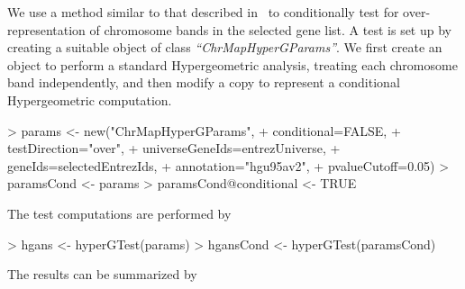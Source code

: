 \documentclass[11pt]{article}
\newcommand{\Rclass}[1]{\textit{``#1''}}
\begin{document}
We use a method similar to that described in~\citet{Falcon-GOstats} to
conditionally test for over-representation of chromosome bands in the
selected gene list.  A test is set up by creating a suitable object of
class \Rclass{ChrMapHyperGParams}.  We first create an object to
perform a standard Hypergeometric analysis, treating each chromosome
band independently, and then modify a copy to represent a conditional
Hypergeometric computation.
%
%
\begin{Schunk}
\begin{Sinput}
> params <- new("ChrMapHyperGParams",
+               conditional=FALSE,
+               testDirection="over",
+               universeGeneIds=entrezUniverse,
+               geneIds=selectedEntrezIds,
+               annotation="hgu95av2",
+               pvalueCutoff=0.05)
> paramsCond <- params
> paramsCond@conditional <- TRUE
\end{Sinput}
\end{Schunk}
%
The test computations are performed by
%
\begin{Schunk}
\begin{Sinput}
> hgans <- hyperGTest(params)
> hgansCond <- hyperGTest(paramsCond)
\end{Sinput}
\end{Schunk}
%
The results can be summarized by
% 
\end{document}
